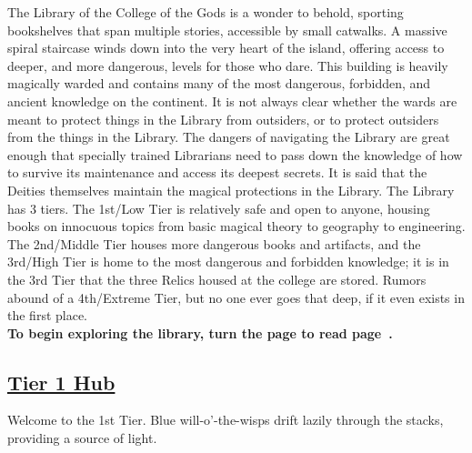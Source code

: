 \documentclass[sheet]{GL2020}
\begin{document}
The Library of the College of the Gods is a wonder to behold, sporting bookshelves that span multiple stories, accessible by small catwalks. A massive spiral staircase winds down into the very heart of the island, offering access to deeper, and more dangerous, levels for those who dare. This building is heavily magically warded and contains many of the most dangerous, forbidden, and ancient knowledge on the continent. It is not always clear whether the wards are meant to protect things in the Library from outsiders, or to protect outsiders from the things in the Library. The dangers of navigating the Library are great enough that specially trained Librarians need to pass down the knowledge of how to survive its maintenance and access its deepest secrets. It is said that the Deities themselves maintain the magical protections in the Library. The Library has 3 tiers. The 1st/Low Tier is relatively safe and open to anyone, housing books on innocuous topics from basic magical theory to geography to engineering. The 2nd/Middle Tier houses more dangerous books and artifacts, and the 3rd/High Tier is home to the most dangerous and forbidden knowledge; it is in the 3rd Tier that the three Relics housed at the college are stored. Rumors abound of a 4th/Extreme Tier, but no one ever goes that deep, if it even exists in the first place.\\


{\large \textbf{To begin exploring the library, turn the page to read page~\pageref{TierOneHub}.}}


\clearpage

\setcounter{page}{1}

\begin{center}\section*{\underline{Tier 1 Hub}}\end{center}
\label{TierOneHub}

Welcome to the 1st Tier. Blue will-o’-the-wisps drift lazily through the stacks, providing a source of light. 

\vspace{0.5cm}
\end{document}
